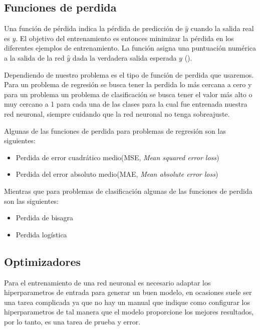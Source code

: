 \subsection{Funciones de perdida}

Una función de pérdida indica la pérdida de predicción de $\hat{y}$ cuando la salida real es $y$. El objetivo del entrenamiento es entonces minimizar la pérdida en los diferentes ejemplos de entrenamiento. La función asigna una puntuación numérica a la salida de la red $\hat{y}$ dada la verdadera salida esperada $y$ (\cite{goldberg2017Neural}).

Dependiendo de nuestro problema es el tipo de función de perdida que usaremos. Para un problema de regresión se busca tener la perdida lo más cercana a cero y para un problema un problema de clasificación se busca tener el valor más alto o muy cercano a 1 para cada una de las clases para la cual fue entrenada nuestra red neuronal, siempre cuidando que la red neuronal no tenga sobreajuste.

Algunas de las funciones de perdida para problemas de  regresión son las siguientes:

\begin{itemize}
    \item Perdida de error cuadrático medio(MSE, \textit{Mean squared error loss})
    \item Perdida del error absoluto medio(MAE, \textit{Mean absolute error loss})
\end{itemize}

Mientras que para problemas de clasificación algunas de las funciones de perdida son las siguientes:

\begin{itemize}
    \item Perdida de bisagra
    \item Perdida logística
\end{itemize}

\subsection{Optimizadores}

Para el entrenamiento de una red neuronal es necesario adaptar los hiperparametros de entrada para generar un buen modelo, en ocasiones suele ser una tarea complicada ya que no hay un manual que indique como configurar los hiperparametros de tal manera que el modelo proporcione los mejores resultados, por lo tanto, es una tarea de prueba y error.

